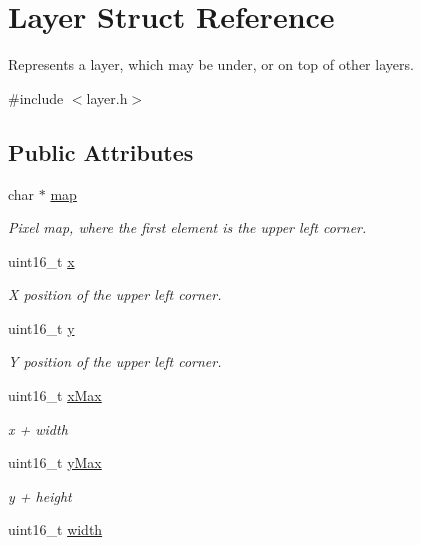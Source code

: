 \hypertarget{struct_layer}{}\section{Layer Struct Reference}
\label{struct_layer}


Represents a layer, which may be under, or on top of other layers.  




{\ttfamily \#include $<$layer.\+h$>$}

\subsection*{Public Attributes}
\begin{DoxyCompactItemize}
\item 
char $\ast$ \mbox{\hyperlink{group__layer_ga4439f4ca4c45e80cb99cf0445226a1c7}{map}}
\begin{DoxyCompactList}\small\item\em Pixel map, where the first element is the upper left corner. \end{DoxyCompactList}\item 
uint16\+\_\+t \mbox{\hyperlink{group__layer_ga93492d1dfe4b2ba659366efc048f4aa6}{x}}
\begin{DoxyCompactList}\small\item\em X position of the upper left corner. \end{DoxyCompactList}\item 
uint16\+\_\+t \mbox{\hyperlink{group__layer_ga7748abe8164b906fa159c0d57c7b0909}{y}}
\begin{DoxyCompactList}\small\item\em Y position of the upper left corner. \end{DoxyCompactList}\item 
uint16\+\_\+t \mbox{\hyperlink{group__layer_gabab5e77cc86413440c0a9f99e851269d}{x\+Max}}
\begin{DoxyCompactList}\small\item\em x + width \end{DoxyCompactList}\item 
uint16\+\_\+t \mbox{\hyperlink{group__layer_ga005d97fb2216101a65f274f4e8d609d9}{y\+Max}}
\begin{DoxyCompactList}\small\item\em y + height \end{DoxyCompactList}\item 
uint16\+\_\+t \mbox{\hyperlink{group__layer_ga9d1e4ca46204961e88006f131c697e97}{width}}

\end{DoxyCompactItemize}
